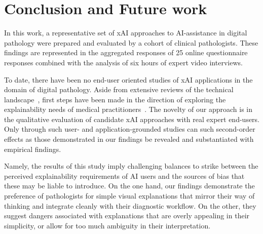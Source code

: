 \section{Conclusion and Future work}
\label{sec:FutureWork}

In this work, a representative set of xAI approaches to AI-assistance in digital pathology were prepared and evaluated by a cohort of clinical pathologists. These findings are represented in the aggregated responses of 25 online questionnaire responses combined with the analysis of six hours of expert video interviews. 

To date, there have been no end-user oriented studies of xAI applications in the domain of digital pathology. Aside from extensive reviews of the technical landscape~\cite{yang2021unbox, poceviciute_survey_2020}, first steps have been made in the direction of exploring the explainability needs of medical practitioners~\cite{liao2020questioning,cai2019hello,wang_designing_2019}. The novelty of our approach is in the qualitative evaluation of candidate xAI approaches with real expert end-users. Only through such user- and application-grounded studies can such second-order effects as those demonstrated in our findings be revealed and substantiated with empirical findings.

Namely, the results of this study imply challenging balances to strike between the perceived explainability requirements of AI users and the sources of bias that these may be liable to introduce. On the one hand, our findings demonstrate the preference of pathologists for simple visual explanations that mirror their way of thinking and integrate cleanly with their diagnostic workflow. On the other, they suggest dangers associated with explanations that are overly appealing in their simplicity, or allow for too much ambiguity in their interpretation.



